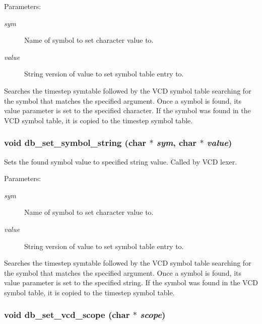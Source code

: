 \begin{Desc}
\item[Parameters: ]\par
\begin{description}
\item[{\em 
sym}]Name of symbol to set character value to. \item[{\em 
value}]String version of value to set symbol table entry to.\end{description}
\end{Desc}
Searches the timestep symtable followed by the VCD symbol table searching for the symbol that matches the specified argument. Once a symbol is found, its value parameter is set to the specified character. If the symbol was found in the VCD symbol table, it is copied to the timestep symbol table. 
\subsubsection{\setlength{\rightskip}{0pt plus 5cm}void db\_\-set\_\-symbol\_\-string (char $\ast$ {\em sym}, char $\ast$ {\em value})}\label{db_8h_a19}


Sets the found symbol value to specified string value. Called by VCD lexer.

\begin{Desc}
\item[Parameters: ]\par
\begin{description}
\item[{\em 
sym}]Name of symbol to set character value to. \item[{\em 
value}]String version of value to set symbol table entry to.\end{description}
\end{Desc}
Searches the timestep symtable followed by the VCD symbol table searching for the symbol that matches the specified argument. Once a symbol is found, its value parameter is set to the specified string. If the symbol was found in the VCD symbol table, it is copied to the timestep symbol table. 
\subsubsection{\setlength{\rightskip}{0pt plus 5cm}void db\_\-set\_\-vcd\_\-scope (char $\ast$ {\em scope})}\label{db_8h_a16}


